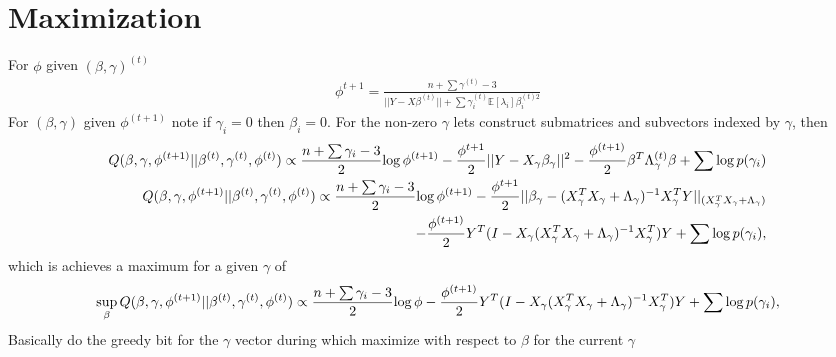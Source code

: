 \documentclass[6pt]{article}
\def\log{{\rm log \,}}
\begin{document}
\section{Maximization}
For $\phi$ given $(\beta,\gamma)^{(t)}$\\
\begin{align*}
	\phi^{t+1}=\frac{n+\sum\gamma^{(t)}-3}{||Y-X\beta^{(t)}||+\sum \gamma_{i}^{(t)}\mathbb{E}\left[ \lambda_{i} \right]\beta_{i}^{(t)2}}
\end{align*}
For $(\beta,\gamma)$ given $\phi^{(t+1)}$ note if $\gamma_{i}=0$ then $\beta_{i}=0$. For the non-zero $\gamma$ lets construct submatrices and subvectors indexed by $\gamma$, then 
\begin{align*}
	Q(\beta,\gamma,\phi^{(t+1)}||\beta^{(t)},\gamma^{(t)},\phi^{(t)})\propto \frac{n+\sum \gamma_{i}-3}{2}\log \phi^{(t+1)} -\frac{\phi^{t+1}}{2}||Y-X_{\gamma}\beta_{\gamma}||^{2}-\frac{\phi^{(t+1)}}{2}\beta^{T}\Lambda_{\gamma}^{(t)}\beta + \sum \log p(\gamma_{i})\\
	Q(\beta,\gamma,\phi^{(t+1)}||\beta^{(t)},\gamma^{(t)},\phi^{(t)})\propto \frac{n+\sum \gamma_{i}-3}{2}\log \phi^{(t+1)} -\frac{\phi^{t+1}}{2}||\beta_{\gamma}-(X_{\gamma}^{T}X_{\gamma}+\Lambda_{\gamma})^{-1}X_{\gamma}^{T}Y||_{(X_{\gamma}^{T}X_{\gamma}+\Lambda_{\gamma})}\\-\frac{\phi^{(t+1)}}{2}Y^{T}(I-X_{\gamma}(X_{\gamma}^{T}X_{\gamma}+\Lambda_{\gamma})^{-1}X_{\gamma}^{T})Y + \sum \log p(\gamma_{i}),
\end{align*}
which is achieves a maximum for a given $\gamma$ of
\begin{align*}
	\sup_{\beta}	Q(\beta,\gamma,\phi^{(t+1)}||\beta^{(t)},\gamma^{(t)},\phi^{(t)})\propto \frac{n+\sum \gamma_{i}-3}{2}\log \phi -\frac{\phi^{(t+1)}}{2}Y^{T}(I-X_{\gamma}(X_{\gamma}^{T}X_{\gamma}+\Lambda_{\gamma})^{-1}X_{\gamma}^{T})Y + \sum \log p(\gamma_{i}),
\end{align*}
Basically do the greedy bit for the $\gamma$ vector during which maximize with respect to $\beta$ for the current $\gamma$
\end{document}
